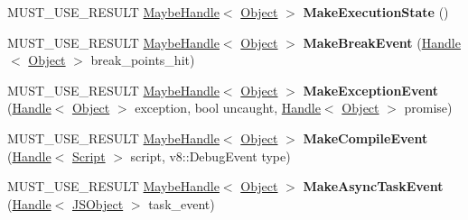 \begin{DoxyCompactItemize}
\item 
M\+U\+S\+T\+\_\+\+U\+S\+E\+\_\+\+R\+E\+S\+U\+LT \hyperlink{classv8_1_1internal_1_1_maybe_handle}{Maybe\+Handle}$<$ \hyperlink{classv8_1_1internal_1_1_object}{Object} $>$ {\bfseries Make\+Execution\+State} ()\hypertarget{classv8_1_1internal_1_1_debug_a65a763117584267d3b8794996e0f4989}{}\label{classv8_1_1internal_1_1_debug_a65a763117584267d3b8794996e0f4989}

\item 
M\+U\+S\+T\+\_\+\+U\+S\+E\+\_\+\+R\+E\+S\+U\+LT \hyperlink{classv8_1_1internal_1_1_maybe_handle}{Maybe\+Handle}$<$ \hyperlink{classv8_1_1internal_1_1_object}{Object} $>$ {\bfseries Make\+Break\+Event} (\hyperlink{classv8_1_1internal_1_1_handle}{Handle}$<$ \hyperlink{classv8_1_1internal_1_1_object}{Object} $>$ break\+\_\+points\+\_\+hit)\hypertarget{classv8_1_1internal_1_1_debug_a3e2b90def0ec8849d30dd032039b1d89}{}\label{classv8_1_1internal_1_1_debug_a3e2b90def0ec8849d30dd032039b1d89}

\item 
M\+U\+S\+T\+\_\+\+U\+S\+E\+\_\+\+R\+E\+S\+U\+LT \hyperlink{classv8_1_1internal_1_1_maybe_handle}{Maybe\+Handle}$<$ \hyperlink{classv8_1_1internal_1_1_object}{Object} $>$ {\bfseries Make\+Exception\+Event} (\hyperlink{classv8_1_1internal_1_1_handle}{Handle}$<$ \hyperlink{classv8_1_1internal_1_1_object}{Object} $>$ exception, bool uncaught, \hyperlink{classv8_1_1internal_1_1_handle}{Handle}$<$ \hyperlink{classv8_1_1internal_1_1_object}{Object} $>$ promise)\hypertarget{classv8_1_1internal_1_1_debug_af3a23f26fc768dad9b50cbdc24190854}{}\label{classv8_1_1internal_1_1_debug_af3a23f26fc768dad9b50cbdc24190854}

\item 
M\+U\+S\+T\+\_\+\+U\+S\+E\+\_\+\+R\+E\+S\+U\+LT \hyperlink{classv8_1_1internal_1_1_maybe_handle}{Maybe\+Handle}$<$ \hyperlink{classv8_1_1internal_1_1_object}{Object} $>$ {\bfseries Make\+Compile\+Event} (\hyperlink{classv8_1_1internal_1_1_handle}{Handle}$<$ \hyperlink{classv8_1_1internal_1_1_script}{Script} $>$ script, v8\+::\+Debug\+Event type)\hypertarget{classv8_1_1internal_1_1_debug_acfc3046cddcc8fc8f5aecf3e38fbf6e1}{}\label{classv8_1_1internal_1_1_debug_acfc3046cddcc8fc8f5aecf3e38fbf6e1}

\item 
M\+U\+S\+T\+\_\+\+U\+S\+E\+\_\+\+R\+E\+S\+U\+LT \hyperlink{classv8_1_1internal_1_1_maybe_handle}{Maybe\+Handle}$<$ \hyperlink{classv8_1_1internal_1_1_object}{Object} $>$ {\bfseries Make\+Async\+Task\+Event} (\hyperlink{classv8_1_1internal_1_1_handle}{Handle}$<$ \hyperlink{classv8_1_1internal_1_1_j_s_object}{J\+S\+Object} $>$ task\+\_\+event)\hypertarget{classv8_1_1internal_1_1_debug_a0cacdbad1d4ee30dca4b37d988b8fb73}{}\label{classv8_1_1internal_1_1_debug_a0cacdbad1d4ee30dca4b37d988b8fb73}


\end{DoxyCompactItemize}
